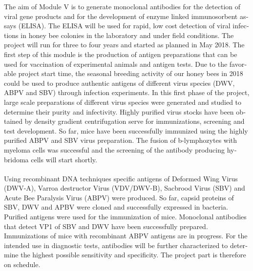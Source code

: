 \begin{otherlanguage}{english}
The aim of Module V is to generate monoclonal antibodies for the detection of viral gene products and for the development of enzyme linked immunosorbent assays (ELISA). The ELISA will be used for rapid, low cost detection of viral infections in honey bee colonies in the laboratory and under field conditions. The project will run for three to four years and started as planned in May 2018. The first step of this module is the production of antigen preparations that can be used for vaccination of experimental animals and antigen tests. Due to the favorable project start time, the seasonal breeding activity of our honey bees in 2018 could be used to produce authentic antigens of different virus species (DWV, ABPV and SBV) through infection experiments. In this first phase of the project, large scale preparations of different virus species were generated and studied to determine their purity and infectivity. Highly purified virus stocks have been obtained by density gradient centrifugation serve for immunizations, screening and test development. So far, mice have been successfully immunized using the highly purified ABPV and SBV virus preparation. The fusion of b-lymphozytes with myeloma cells was successful and the screening of the antibody producing hybridoma cells will start shortly.
\\
\\
Using recombinant DNA techniques specific antigens of Deformed Wing Virus (DWV-A), Varroa destructor Virus (VDV/DWV-B), Sacbrood Virus (SBV) and Acute Bee Paralysis Virus (ABPV) were produced. So far, capsid proteins of SBV, DWV and APBV were cloned and successfully expressed in bacteria. Purified antigens were used for the immunization of mice. Monoclonal antibodies that detect VP1 of SBV and DWV have been successfully prepared. Immunizations of mice with recombinant ABPV antigens are in progress.  For the intended use in diagnostic tests, antibodies will be further characterized to determine the highest possible sensitivity and specificity.
The project part is therefore on schedule.

\end{otherlanguage}
